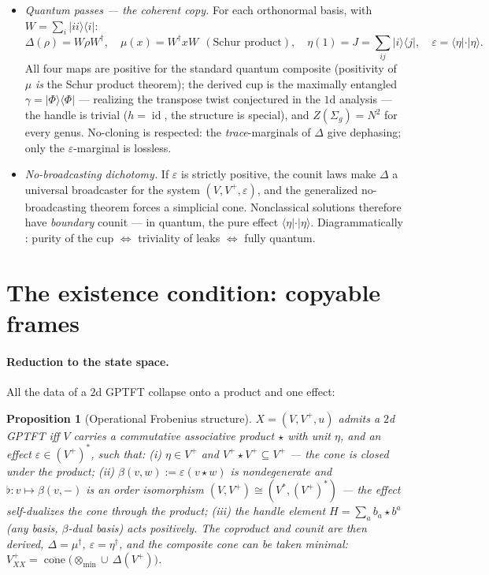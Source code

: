 \documentclass[prl,aps,10pt,superscriptaddress,floatfix]{revtex4-2}
\newtheorem{prop}{Proposition}
\begin{document}
\begin{itemize}
\item \emph{Quantum passes --- the coherent copy.} For each orthonormal basis, with $W=\sum_i|ii\rangle\langle i|$:
\[
\Delta(\rho)=W\rho W^\dagger,\quad
\mu(x)=W^\dagger xW\ \ (\text{Schur product}),\quad
\eta(1)=J=\textstyle\sum_{ij}|i\rangle\langle j|,\quad
\varepsilon=\langle\eta|\cdot|\eta\rangle .
\]
All four maps are positive for the standard quantum composite (positivity of $\mu$ \emph{is} the Schur product theorem); the derived cup is the maximally entangled $\gamma=|\Phi\rangle\langle\Phi|$ --- realizing the transpose twist conjectured in the $1$d analysis --- the handle is trivial ($h=\operatorname{id}$, the structure is special), and $Z(\Sigma_g)=N^2$ for every genus. No-cloning is respected: the \emph{trace}-marginals of $\Delta$ give dephasing; only the $\varepsilon$-marginal is lossless.
\item \emph{No-broadcasting dichotomy.} If $\varepsilon$ is strictly positive, the counit laws make $\Delta$ a universal broadcaster for the system $(V,V^+,\varepsilon)$, and the generalized no-broadcasting theorem \cite{BBLWnobroadcast} forces a simplicial cone. Nonclassical solutions therefore have \emph{boundary} counit --- in quantum, the pure effect $\langle\eta|\cdot|\eta\rangle$. Diagrammatically \cite{SSC2021}: purity of the cup $\iff$ triviality of leaks $\iff$ fully quantum.
\end{itemize}

\section{The existence condition: copyable frames}\label{sec:condition}

\paragraph{Reduction to the state space.}
All the data of a $2$d GPTFT collapse onto a product and one effect:

\begin{prop}[Operational Frobenius structure]\label{prop:ofs}
$X=(V,V^+,u)$ admits a $2$d GPTFT iff $V$ carries a commutative associative product $\star$ with unit $\eta$, and an effect $\varepsilon\in(V^+)^*$, such that:
\emph{(i)} $\eta\in V^+$ and $V^+\!\star V^+\subseteq V^+$ --- \emph{the cone is closed under the product};
\emph{(ii)} $\beta(v,w):=\varepsilon(v\star w)$ is nondegenerate and $\flat:v\mapsto\beta(v,-)$ is an order isomorphism $(V,V^+)\cong(V^*,(V^+)^*)$ --- \emph{the effect self-dualizes the cone through the product};
\emph{(iii)} the handle element $H=\sum_a b_a\star b^a$ (any basis, $\beta$-dual basis) acts positively.
The coproduct and counit are then derived, $\Delta=\mu^{\dagger}$, $\varepsilon=\eta^{\dagger}$, and the composite cone can be taken minimal: $V^+_{XX}=\overline{\operatorname{cone}}\big(\otimes_{\min}\cup\,\Delta(V^+)\big)$.
\end{prop}
\end{document}

